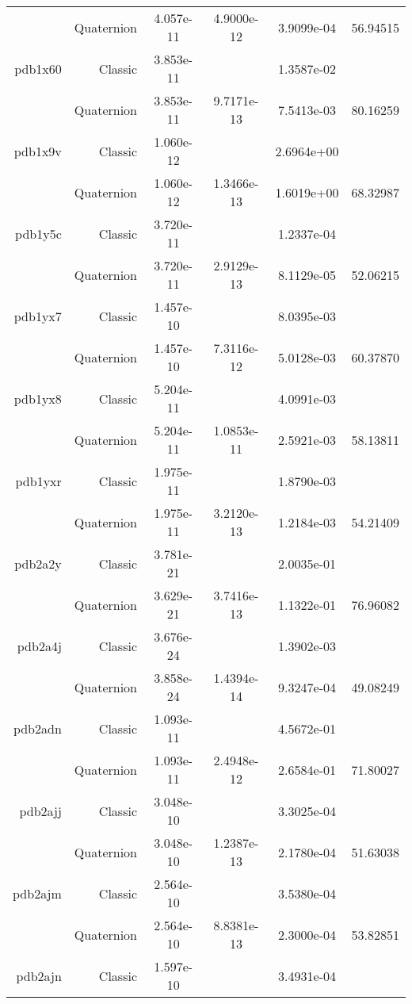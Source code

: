 \begin{xltabular}{\textwidth}{r|rS[table-format=1.3e+2]S[table-format=1.4e+2]S[table-format=1.4e+2]S[table-format=-1.5]}
& Quaternion & 4.057e-11 & 4.9000e-12 & 3.9099e-04 & 56.94515\\  \addlinespace
pdb1x60 & Classic & 3.853e-11 &  & 1.3587e-02 & \\
& Quaternion & 3.853e-11 & 9.7171e-13 & 7.5413e-03 & 80.16259\\  \addlinespace
pdb1x9v & Classic & 1.060e-12 &  & 2.6964e+00 & \\
& Quaternion & 1.060e-12 & 1.3466e-13 & 1.6019e+00 & 68.32987\\  \addlinespace
pdb1y5c & Classic & 3.720e-11 &  & 1.2337e-04 & \\
& Quaternion & 3.720e-11 & 2.9129e-13 & 8.1129e-05 & 52.06215\\  \addlinespace
pdb1yx7 & Classic & 1.457e-10 &  & 8.0395e-03 & \\
& Quaternion & 1.457e-10 & 7.3116e-12 & 5.0128e-03 & 60.37870\\  \addlinespace
pdb1yx8 & Classic & 5.204e-11 &  & 4.0991e-03 & \\
& Quaternion & 5.204e-11 & 1.0853e-11 & 2.5921e-03 & 58.13811\\  \addlinespace
pdb1yxr & Classic & 1.975e-11 &  & 1.8790e-03 & \\
& Quaternion & 1.975e-11 & 3.2120e-13 & 1.2184e-03 & 54.21409\\  \addlinespace
pdb2a2y & Classic & 3.781e-21 &  & 2.0035e-01 & \\
& Quaternion & 3.629e-21 & 3.7416e-13 & 1.1322e-01 & 76.96082\\  \addlinespace
pdb2a4j & Classic & 3.676e-24 &  & 1.3902e-03 & \\
& Quaternion & 3.858e-24 & 1.4394e-14 & 9.3247e-04 & 49.08249\\  \addlinespace
pdb2adn & Classic & 1.093e-11 &  & 4.5672e-01 & \\
& Quaternion & 1.093e-11 & 2.4948e-12 & 2.6584e-01 & 71.80027\\  \addlinespace
pdb2ajj & Classic & 3.048e-10 &  & 3.3025e-04 & \\
& Quaternion & 3.048e-10 & 1.2387e-13 & 2.1780e-04 & 51.63038\\  \addlinespace
pdb2ajm & Classic & 2.564e-10 &  & 3.5380e-04 & \\
& Quaternion & 2.564e-10 & 8.8381e-13 & 2.3000e-04 & 53.82851\\  \addlinespace
pdb2ajn & Classic & 1.597e-10 &  & 3.4931e-04 & \\

\end{xltabular}
